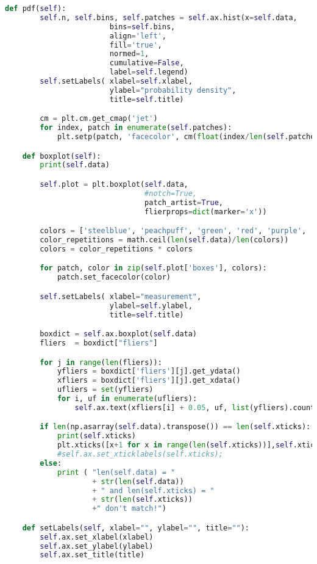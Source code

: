 \begin{lstlisting}[language=Python,caption=myplot.py]
    def pdf(self):
        self.n, self.bins, self.patches = self.ax.hist(x=self.data,
                        bins=self.bins,
                        align='left',
                        fill='true',
                        normed=1,
                        cumulative=False,
                        label=self.legend)
        self.setLabels( xlabel=self.xlabel,
                        ylabel="probability density",
                        title=self.title)

        cm = plt.cm.get_cmap('jet')
        for index, patch in enumerate(self.patches):
            plt.setp(patch, 'facecolor', cm(float(index/len(self.patches))))

    def boxplot(self):
        print(self.data)

        self.plot = plt.boxplot(self.data,
                                #notch=True,
                                patch_artist=True,
                                flierprops=dict(marker='x'))

        colors = ['steelblue', 'peachpuff', 'green', 'red', 'purple', 'brown', 'pink']
        color_repetitions = math.ceil(len(self.data)/len(colors))
        colors = color_repetitions * colors

        for patch, color in zip(self.plot['boxes'], colors):
            patch.set_facecolor(color)

        self.setLabels( xlabel="measurement",
                        ylabel=self.ylabel,
                        title=self.title)

        boxdict = self.ax.boxplot(self.data)
        fliers  = boxdict["fliers"]

        for j in range(len(fliers)):
            yfliers = boxdict['fliers'][j].get_ydata()
            xfliers = boxdict['fliers'][j].get_xdata()
            ufliers = set(yfliers)
            for i, uf in enumerate(ufliers):
                self.ax.text(xfliers[i] + 0.05, uf, list(yfliers).count(uf))

        if len(np.asarray(self.data).transpose()) == len(self.xticks):
            print(self.xticks)
            plt.xticks([x+1 for x in range(len(self.xticks))],self.xticks)
            #self.ax.set_xticklabels(self.xticks);
        else:
            print ( "len(self.data) = "
                    + str(len(self.data))
                    + " and len(self.xticks) = "
                    + str(len(self.xticks))
                    +" don't match!")

    def setLabels(self, xlabel="", ylabel="", title=""):
        self.ax.set_xlabel(xlabel)
        self.ax.set_ylabel(ylabel)
        self.ax.set_title(title)


\end{lstlisting}
